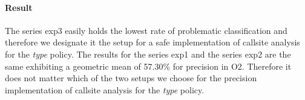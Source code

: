 \paragraph{Result} The series exp3 easily holds the lowest rate of problematic classification and therefore we designate it the setup for a safe implementation of callsite analysis for the \textit{type} policy. The results for the series exp1 and the series exp2 are the same exhibiting a geometric mean of 57.30\% for precision in O2. Therefore it does not matter which of the two setups we choose for the precision implementation of callsite analysis for the \textit{type} policy.

\begin{table}[!htbp]
\centering
{}
\end{table}
